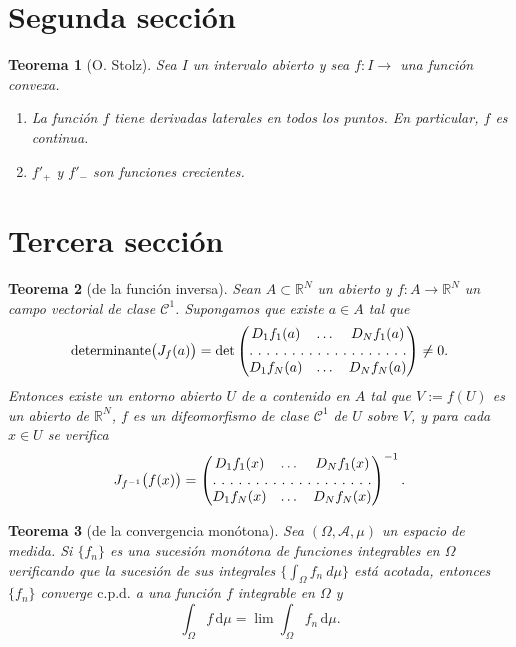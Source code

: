 \documentclass[11pt]{article}
\numberwithin{equation}{section}
\DeclareMathOperator{\deter}{determinante}
\theoremstyle{plain}
\newtheorem{teorema}{Teorema}[section]
\theoremstyle{definition}
\theoremstyle{remark}
\begin{document}
\section{Segunda sección}


\begin{teorema}[O. Stolz] \label{th:cc}
 Sea $I$ un intervalo abierto y sea $f \colon I \rightarrow$ una función convexa.
 \begin{enumerate}
  \item La función $f$ tiene derivadas laterales en todos los puntos. En particular, $f$ es continua.
  \item $f'_{+}$ y $f'_{-}$ son funciones crecientes.
 \end{enumerate}
\end{teorema}

\section{Tercera sección}

\begin{teorema}[de la función inversa]\label{th:inversa}
 Sean $A\subset \mathbb{R}^N$ un
 abierto y $f\colon A\rightarrow \mathbb{R}^{N}$ un campo vectorial de clase
 $\mathcal{C}^1$. Supongamos que existe $a\in A$ tal que
 \[
  \deter \bigl (J_f(a)\bigr )=\det
  \left(
  \begin{matrix}
    D_1 f_1 (a) & \dotsc & D_{N} f_{1}(a) \\
    \hdotsfor[2]{3}                       \\
    D_1f_N(a)   & \dotsc & D_N f_N(a)
   \end{matrix}
  \right)
  \neq 0.
 \]
 Entonces existe un entorno abierto $U$ de $a$ contenido en $A$ tal
 que $V:=f(U)$ es un abierto de $\mathbb{R}^N$, $f$ es un difeomorfismo de
 clase $\mathcal{C}^1$ de $U$ sobre $V$, y para cada $x\in U$ se
 verifica
 \[
  J_{f^{-1}}\bigl (f(x)\bigr )=
  \begin{pmatrix}
   D_1f_1(x) & \dotsc & D_Nf_1(x) \\
   \hdotsfor[2]{3}                \\
   D_1f_N(x) & \dotsc & D_Nf_N(x)
  \end{pmatrix}^{-1}.
 \]
\end{teorema}

\begin{teorema}[de la convergencia monótona]
 Sea $(\Omega,\mathcal{A},\mu)$ un espacio de medida. Si $\{f_n\}$ es
 una sucesión monótona de funciones integrables en $\Omega$
 verificando que la sucesión de sus integrales $\big
  \{\int_{\Omega}f_n\  d\mu \big \}$ está acotada, entonces
 $\{f_n\}$ converge $\text{c.p.d.}$ a una función $f$ integrable en
 $\Omega$ y
 \[
  \int_{\Omega}f\, \mathrm{d}\mu=\lim \int_{\Omega}f_n\, \mathrm{d}\mu .
 \]
\end{teorema}
\end{document}
